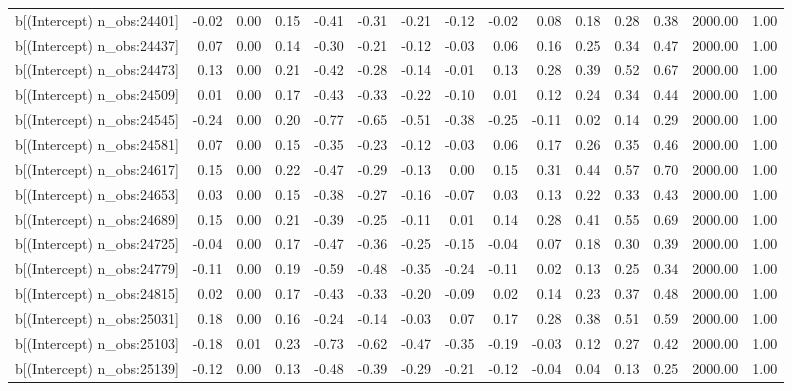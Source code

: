 \begin{table}[ht]
\begin{tabular}{rrrrrrrrrrrrrrr}
  b[(Intercept) n\_obs:24401] & -0.02 & 0.00 & 0.15 & -0.41 & -0.31 & -0.21 & -0.12 & -0.02 & 0.08 & 0.18 & 0.28 & 0.38 & 2000.00 & 1.00 \\ 
  b[(Intercept) n\_obs:24437] & 0.07 & 0.00 & 0.14 & -0.30 & -0.21 & -0.12 & -0.03 & 0.06 & 0.16 & 0.25 & 0.34 & 0.47 & 2000.00 & 1.00 \\ 
  b[(Intercept) n\_obs:24473] & 0.13 & 0.00 & 0.21 & -0.42 & -0.28 & -0.14 & -0.01 & 0.13 & 0.28 & 0.39 & 0.52 & 0.67 & 2000.00 & 1.00 \\ 
  b[(Intercept) n\_obs:24509] & 0.01 & 0.00 & 0.17 & -0.43 & -0.33 & -0.22 & -0.10 & 0.01 & 0.12 & 0.24 & 0.34 & 0.44 & 2000.00 & 1.00 \\ 
  b[(Intercept) n\_obs:24545] & -0.24 & 0.00 & 0.20 & -0.77 & -0.65 & -0.51 & -0.38 & -0.25 & -0.11 & 0.02 & 0.14 & 0.29 & 2000.00 & 1.00 \\ 
  b[(Intercept) n\_obs:24581] & 0.07 & 0.00 & 0.15 & -0.35 & -0.23 & -0.12 & -0.03 & 0.06 & 0.17 & 0.26 & 0.35 & 0.46 & 2000.00 & 1.00 \\ 
  b[(Intercept) n\_obs:24617] & 0.15 & 0.00 & 0.22 & -0.47 & -0.29 & -0.13 & 0.00 & 0.15 & 0.31 & 0.44 & 0.57 & 0.70 & 2000.00 & 1.00 \\ 
  b[(Intercept) n\_obs:24653] & 0.03 & 0.00 & 0.15 & -0.38 & -0.27 & -0.16 & -0.07 & 0.03 & 0.13 & 0.22 & 0.33 & 0.43 & 2000.00 & 1.00 \\ 
  b[(Intercept) n\_obs:24689] & 0.15 & 0.00 & 0.21 & -0.39 & -0.25 & -0.11 & 0.01 & 0.14 & 0.28 & 0.41 & 0.55 & 0.69 & 2000.00 & 1.00 \\ 
  b[(Intercept) n\_obs:24725] & -0.04 & 0.00 & 0.17 & -0.47 & -0.36 & -0.25 & -0.15 & -0.04 & 0.07 & 0.18 & 0.30 & 0.39 & 2000.00 & 1.00 \\ 
  b[(Intercept) n\_obs:24779] & -0.11 & 0.00 & 0.19 & -0.59 & -0.48 & -0.35 & -0.24 & -0.11 & 0.02 & 0.13 & 0.25 & 0.34 & 2000.00 & 1.00 \\ 
  b[(Intercept) n\_obs:24815] & 0.02 & 0.00 & 0.17 & -0.43 & -0.33 & -0.20 & -0.09 & 0.02 & 0.14 & 0.23 & 0.37 & 0.48 & 2000.00 & 1.00 \\ 
  b[(Intercept) n\_obs:25031] & 0.18 & 0.00 & 0.16 & -0.24 & -0.14 & -0.03 & 0.07 & 0.17 & 0.28 & 0.38 & 0.51 & 0.59 & 2000.00 & 1.00 \\ 
  b[(Intercept) n\_obs:25103] & -0.18 & 0.01 & 0.23 & -0.73 & -0.62 & -0.47 & -0.35 & -0.19 & -0.03 & 0.12 & 0.27 & 0.42 & 2000.00 & 1.00 \\ 
  b[(Intercept) n\_obs:25139] & -0.12 & 0.00 & 0.13 & -0.48 & -0.39 & -0.29 & -0.21 & -0.12 & -0.04 & 0.04 & 0.13 & 0.25 & 2000.00 & 1.00 \\ 

\end{tabular}
\end{table}
